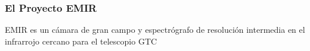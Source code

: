 \begin{frame}
    \frametitle{El Proyecto EMIR}
		EMIR es un cámara de gran campo y espectrógrafo de resolución intermedia en el infrarrojo cercano para el telescopio GTC
    \endblock{}
\end{frame}




%
